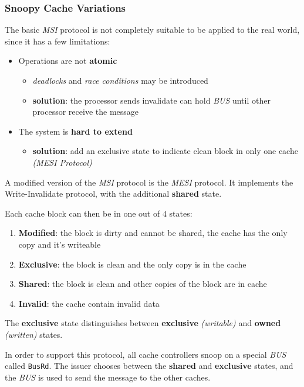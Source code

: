 \documentclass[english]{article}
\begin{document}
\subsubsection{Snoopy Cache Variations}

The basic \textit{MSI} protocol is not completely suitable to be applied to the real world, since it has a few limitations:

\begin{itemize}
  \item Operations are not \textbf{atomic}
        \begin{itemize}
          \item \textit{deadlocks} and \textit{race conditions} may be introduced
          \item \textbf{solution}: the processor sends invalidate can hold \textit{BUS} until other processor receive the message
        \end{itemize}
  \item The system is \textbf{hard to extend}
        \begin{itemize}
          \item \textbf{solution}: add an exclusive state to indicate clean block in only one cache \textit{(MESI Protocol)}
        \end{itemize}
\end{itemize}

\bigskip
A modified version of the \textit{MSI} protocol is the \textit{MESI} protocol.
It implements the Write-Invalidate protocol, with the additional \textbf{shared} state.

Each cache block can then be in one out of \(4\) states:

\begin{enumerate}
  \item \textbf{Modified}: the block is dirty and cannot be shared, the cache has the only copy and it's writeable
  \item \textbf{Exclusive}: the block is clean and the only copy is in the cache
  \item \textbf{Shared}: the block is clean and other copies of the block are in cache
  \item \textbf{Invalid}: the cache contain invalid data
\end{enumerate}

The \textbf{exclusive} state distinguishes between \textbf{exclusive} \textit{(writable)} and \textbf{owned} \textit{(written)} states.

In order to support this protocol, all cache controllers snoop on a special \textit{BUS} called \texttt{BusRd}.
The issuer chooses between the \textbf{shared} and \textbf{exclusive} states, and the \textit{BUS} is used to send the message to the other caches.
\end{document}

